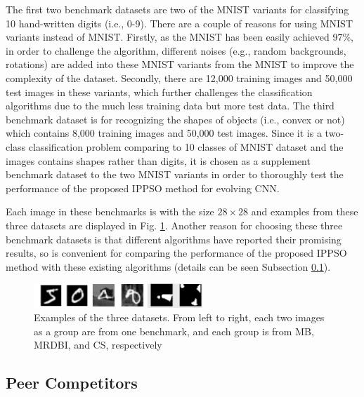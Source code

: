\documentclass[conference]{IEEEtran}
\begin{document}
The first two benchmark datasets are two of the MNIST \cite{DocumentRecognition:LeCun} variants for classifying 10 hand-written digits (i.e., 0-9). There are a couple of reasons for using MNIST variants instead of MNIST. Firstly, as the MNIST has been easily achieved 97\%, in order to challenge the algorithm, different noises (e.g., random backgrounds, rotations) are added into these MNIST variants from the MNIST to improve the complexity of the dataset. Secondly, there are 12,000 training images and 50,000 test images in these variants, which further challenges the classification algorithms due to the much less training data but more test data. The third benchmark dataset is for recognizing the shapes of objects (i.e., convex or not) which contains 8,000 training images and 50,000 test images. Since it is a two-class classification problem comparing to 10 classes of MNIST dataset and the images contains shapes rather than digits, it is chosen as a supplement benchmark dataset to the two MNIST variants in order to thoroughly test the performance of the proposed IPPSO method for evolving CNN. 

Each image in these benchmarks is with the size $28 \times 28$ and examples from these three datasets are displayed in Fig. \ref{fig:images}. Another reason for choosing these three benchmark datasets is that different algorithms have reported their promising results, so is convenient for comparing the performance of the proposed IPPSO method with these existing algorithms (details can be seen Subsection \ref{secpeer-competitors}).

\begin{figure}[!t]
	\centering
	\includegraphics[width=2.5in]{ippso_image_samples}
	\caption{Examples of the three datasets. From left to right, each two images as a group are from one benchmark, and each group is from MB, MRDBI, and CS, respectively}
	\label{fig:images}
\end{figure}


\subsection{Peer Competitors}\label{secpeer-competitors}
\end{document}
